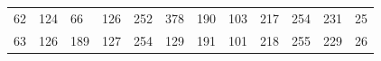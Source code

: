 \begin{table}[]
\begin{tabular}{llllllllllll}
62                     & 124                    & 66                     & 126                    & 252                    & 378                    & 190                    & 103                    & 217                    & 254                    & 231                    & 25                     \\
63                     & 126                    & 189                    & 127                    & 254                    & 129                    & 191                    & 101                    & 218                    & 255                    & 229                    & 26                    
\end{tabular}
\label{t:GFMLT}
\end{table}